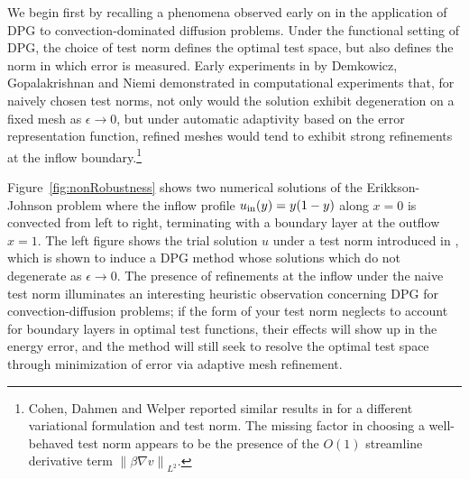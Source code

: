 \documentclass[11pt,onecolumn]{scrartcl}
\newcommand{\nor}[1]{\left\| #1 \right\|}
\newcommand{\grad}{\nabla}
\begin{document}
We begin first by recalling a phenomena observed early on in the application of DPG to convection-dominated diffusion problems.  Under the functional setting of DPG, the choice of test norm defines the optimal test space, but also defines the norm in which error is measured.  Early experiments in \cite{DPG3} by Demkowicz, Gopalakrishnan and Niemi demonstrated in computational experiments that, for naively chosen test norms, not only would the solution exhibit degeneration on a fixed mesh as $\epsilon\rightarrow 0$, but under automatic adaptivity based on the error representation function, refined meshes would tend to exhibit strong refinements at the inflow boundary.\footnote{Cohen, Dahmen and Welper reported similar results in \cite{DahmenVariationalStabilization} for a different variational formulation and test norm.  The missing factor in choosing a well-behaved test norm appears to be the presence of the $O(1)$ streamline derivative term $\nor{\beta \grad v}_{L^2}$.}  

Figure~\ref{fig:nonRobustness} shows two numerical solutions of the Erikkson-Johnson problem where the inflow profile $u_{\rm in}(y) = y(1-y)$ along $x=0$ is convected from left to right, terminating with a boundary layer at the outflow $x=1$.  The left figure shows the trial solution $u$ under a test norm introduced in \cite{DPGrobustness}, which is shown to induce a DPG method whose solutions which do not degenerate as $\epsilon\rightarrow 0$.  The presence of refinements at the inflow under the naive test norm illuminates an interesting heuristic observation concerning DPG for convection-diffusion problems; if the form of your test norm neglects to account for boundary layers in optimal test functions, their effects will show up in the energy error, and the method will still seek to resolve the optimal test space through minimization of error via adaptive mesh refinement.  
\end{document}
